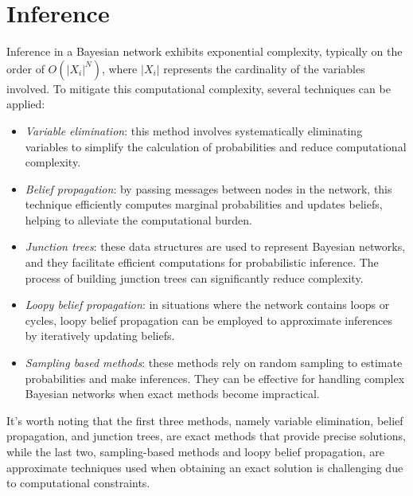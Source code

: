 \section{Inference}

Inference in a Bayesian network exhibits exponential complexity, typically on the order of $O(\left\lvert X_i \right\rvert^N)$, where $\left\lvert X_i \right\rvert$ represents the cardinality of the variables involved. 
To mitigate this computational complexity, several techniques can be applied:
\begin{itemize}
    \item \textit{Variable elimination}: this method involves systematically eliminating variables to simplify the calculation of probabilities and reduce computational complexity.
    \item \textit{Belief propagation}: by passing messages between nodes in the network, this technique efficiently computes marginal probabilities and updates beliefs, helping to alleviate the computational burden.
    \item \textit{Junction trees}: these data structures are used to represent Bayesian networks, and they facilitate efficient computations for probabilistic inference. 
        The process of building junction trees can significantly reduce complexity.
    \item \textit{Loopy belief propagation}: in situations where the network contains loops or cycles, loopy belief propagation can be employed to approximate inferences by iteratively updating beliefs.
    \item \textit{Sampling based methods}: these methods rely on random sampling to estimate probabilities and make inferences. 
        They can be effective for handling complex Bayesian networks when exact methods become impractical.
\end{itemize}
It's worth noting that the first three methods, namely variable elimination, belief propagation, and junction trees, are exact methods that provide precise solutions, while the last two, sampling-based methods and loopy belief propagation, are approximate techniques used when obtaining an exact solution is challenging due to computational constraints.